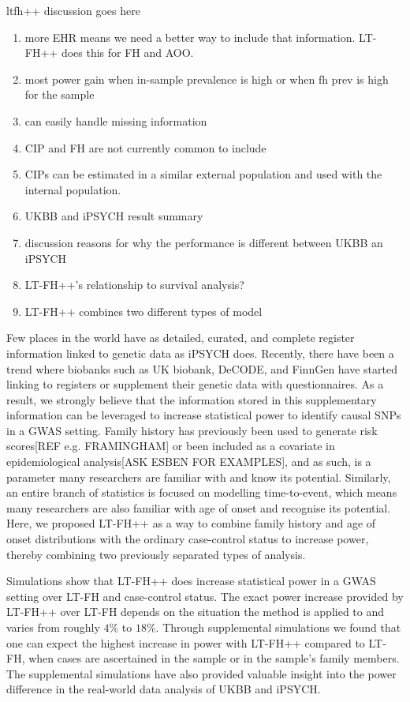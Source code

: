 ltfh++ discussion goes here

\begin{enumerate}
	\item more EHR means we need a better way to include that information. LT-FH++ does this for FH and AOO.
	\item most power gain when in-sample prevalence is high or when fh prev is high for the sample
	\item can easily handle missing information
	\item CIP and FH are not currently common to include
	\item CIPs can be estimated in a similar external population and used with the internal population.
	\item UKBB and iPSYCH result summary
	\item discussion reasons for why the performance is different between UKBB an iPSYCH
	\item LT-FH++'s relationship to survival analysis?
	\item LT-FH++ combines two different types of model
\end{enumerate}


Few places in the world have as detailed, curated, and complete register information linked to genetic data as iPSYCH does. Recently, there have been a trend where biobanks such as UK biobank, DeCODE, and FinnGen have started linking to registers or supplement their genetic data with questionnaires. As a result, we strongly believe that the information stored in this supplementary information can be leveraged to increase statistical power to identify causal SNPs in a GWAS setting. Family history has previously been used to generate risk scores[REF e.g. FRAMINGHAM] or been included as a covariate in epidemiological analysis[ASK ESBEN FOR EXAMPLES], and as such, is a parameter many researchers are familiar with and know its potential. Similarly, an entire branch of statistics is focused on modelling time-to-event, which means many researchers are also familiar with age of onset and recognise its potential. Here, we proposed LT-FH++ as a way to combine family history and age of onset distributions with the ordinary case-control status to increase power, thereby combining two previously separated types of analysis.

Simulations show that LT-FH++ does increase statistical power in a GWAS setting over LT-FH and case-control status. The exact power increase provided by LT-FH++ over LT-FH depends on the situation the method is applied to and varies from roughly $ 4\% $ to $ 18\% $. Through supplemental simulations we found that one can expect the highest increase in power with LT-FH++ compared to LT-FH, when cases are ascertained in the sample or in the sample's family members. The supplemental simulations have also provided valuable insight into the power difference in the real-world data analysis of UKBB and iPSYCH.

